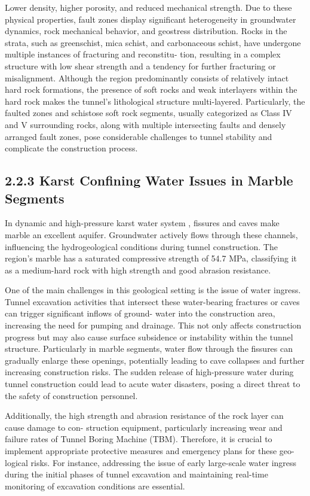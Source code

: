 \documentclass[11pt]{article}
\begin{document}
Lower density, higher porosity, and reduced mechanical strength. Due to these physical properties, fault zones display significant heterogeneity in groundwater dynamics, rock mechanical behavior, and geostress distribution. Rocks in the strata, such as greenschist, mica schist, and carbonaceous schist, have undergone multiple instances of fracturing and reconstitu- tion, resulting in a complex structure with low shear strength and a tendency for further fracturing or misalignment. Although the region predominantly consists of relatively intact hard rock formations, the presence of soft rocks and weak interlayers within the hard rock makes the tunnel’s lithological structure multi-layered.  Particularly, the faulted zones and schistose soft rock segments, usually categorized as Class IV and V surrounding rocks, along with multiple intersecting faults and densely arranged fault zones, pose considerable challenges to tunnel stability and complicate the construction process.

\subsection*{2.2.3 Karst Confining Water Issues in Marble Segments}

In dynamic and high-pressure karst water system \parencite{bib5},  fissures and caves make marble an excellent aquifer. Groundwater actively flows through these channels, influencing the hydrogeological conditions during tunnel construction. The region’s marble has a saturated compressive strength of 54.7 MPa, classifying it as a medium-hard rock with high strength and good abrasion resistance.

One of the main challenges in this geological setting is the issue of water ingress. Tunnel excavation activities that intersect these water-bearing fractures or caves can trigger significant inflows of ground- water into the construction area, increasing the need for pumping and drainage.  This not only affects construction progress but may also cause surface subsidence or instability within the tunnel structure. Particularly in marble segments, water flow through the fissures can gradually enlarge these openings, potentially leading to cave collapses and further increasing construction risks.  The sudden release of high-pressure water during tunnel construction could lead to acute water disasters, posing a direct threat to the safety of construction personnel.

Additionally, the high strength and abrasion resistance of the rock layer can cause damage to con- struction equipment, particularly increasing wear and failure rates of Tunnel Boring Machine (TBM). Therefore, it is crucial to implement appropriate protective measures and emergency plans for these geo- logical risks. For instance, addressing the issue of early large-scale water ingress during the initial phases of tunnel excavation and maintaining real-time monitoring of excavation conditions are essential.
\end{document}
